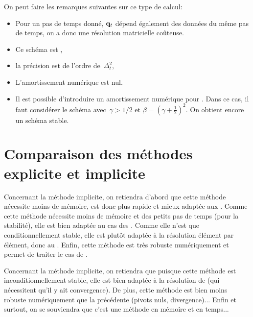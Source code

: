 \medskip
On peut faire les remarques suivantes sur ce type de calcul:
\begin{itemize}
  \item Pour un pas de temps donné, $\VV{q}_t$ dépend également des données du même pas de temps,
	on a donc une résolution matricielle coûteuse.
  \item Ce schéma est , 
  \item la précision est de l'ordre de~$\Delta_t^2$, 
  \item L'amortissement numérique est nul.
  \item Il est possible d'introduire un amortissement numérique pour . Dans ce cas, il faut considérer le schéma avec~$\gamma>1/2$ et
	$\beta=(\gamma+\frac12)^2$. On obtient encore un schéma stable.
\end{itemize}



\medskip
\section{Comparaison des méthodes explicite et implicite}

Concernant la méthode implicite, on retiendra d'abord que cette méthode nécessite moins de mémoire, est donc plus rapide et mieux adaptée aux . Comme cette méthode nécessite moins de mémoire et des petits pas de temps (pour la stabilité), elle est bien adaptée au cas des . Comme elle n'est que conditionnellement stable, elle est plutôt adaptée à la résolution élément par élément, donc au . Enfin, cette méthode est très robuste numériquement et permet de traiter le cas de .


\medskip
Concernant la méthode implicite, on retiendra que puisque cette méthode est inconditionnellement stable, elle est bien adaptée à la résolution de  (qui nécessitent qu'il y ait convergence). De plus, cette méthode est bien moins robuste numériquement que la précédente (pivots nuls,  divergence)... Enfin et surtout, on se souviendra que c'est une méthode  en mémoire et en temps...

